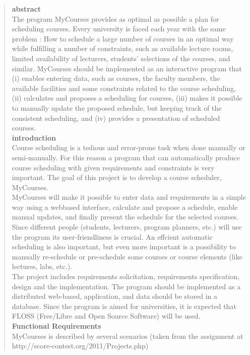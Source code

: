 \documentclass{article}
\begin{document}
\begin{quotation}

\textbf{abstract}\\
The program MyCourses provides as optimal as possible a plan for scheduling courses. Every university is faced each year with the same problem : How to schedule a large number of courses in an optimal way while fulfilling a number of constraints, such as available lecture rooms, limited availability of lecturers, students' selections of the courses, and similar. MyCourses should be implemented as an interactive program that (i) enables entering data, such as courses, the faculty members, the available facilities and some constraints related to the course scheduling, (ii) calculates and proposes a scheduling for courses, (iii) makes it possible to manually update the proposed schedule, but keeping track of the consistent scheduling, and (iv) provides a presentation of scheduled courses.\\[3mm]
\textbf{introduction}\\
Course scheduling is a tedious and error-prone task when done manually or semi-manually. For this reason a program that can automatically produce course scheduling with given requirements and constraints is very important. The goal of this project is to develop a course scheduler, MyCourses.\\
MyCourses will make it possible to enter data and requirements in a simple way using a webbased interface, calculate and propose a schedule, enable manual updates, and finally present the schedule for the selected courses. Since different people (students, lecturers, program planners, etc.) will use the program its user-friendliness is crucial. An effcient automatic scheduling is also important, but even more important is a possibility to manually re-schedule or pre-schedule some courses or course elements (like lectures, labs, etc.).\\ The project includes requirements solicitation, requirements specification, design and the implementation. The program should be implemented as a distributed web-based, application, and data should be stored in a database. Since the program is aimed for universities, it is expected that FLOSS (Free/Libre and Open Source Software) will be used.\\[3mm]
\textbf{Functional Requirements}\\
MyCourses is described by several scenarios (taken from the assignment at http://score-contest.org/2011/Projects.php)\\[-4mm]

\end{quotation}
\end{document}

